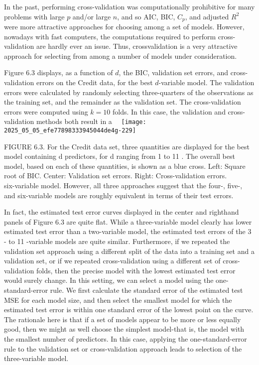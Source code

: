 \documentclass[10pt]{article}
\begin{document}
In the past, performing cross-validation was computationally prohibitive for many problems with large $p$ and/or large $n$, and so AIC, BIC, $C_{p}$, and adjusted $R^{2}$ were more attractive approaches for choosing among a set of models. However, nowadays with fast computers, the computations required to perform cross-validation are hardly ever an issue. Thus, crossvalidation is a very attractive approach for selecting from among a number of models under consideration.

Figure 6.3 displays, as a function of $d$, the BIC, validation set errors, and cross-validation errors on the Credit data, for the best $d$-variable model. The validation errors were calculated by randomly selecting three-quarters of the observations as the training set, and the remainder as the validation set. The cross-validation errors were computed using $k=10$ folds. In this case, the validation and cross-validation methods both result in a\
\
\texttt{[image: 2025\_05\_05\_efe77898333945044de4g-229]}

FIGURE 6.3. For the Credit data set, three quantities are displayed for the best model containing d predictors, for d ranging from 1 to 11 . The overall best model, based on each of these quantities, is shown as a blue cross. Left: Square root of BIC. Center: Validation set errors. Right: Cross-validation errors.\\
six-variable model. However, all three approaches suggest that the four-, five-, and six-variable models are roughly equivalent in terms of their test errors.

In fact, the estimated test error curves displayed in the center and righthand panels of Figure 6.3 are quite flat. While a three-variable model clearly has lower estimated test error than a two-variable model, the estimated test errors of the 3 - to 11 -variable models are quite similar. Furthermore, if we repeated the validation set approach using a different split of the data into a training set and a validation set, or if we repeated cross-validation using a different set of cross-validation folds, then the precise model with the lowest estimated test error would surely change. In this setting, we can select a model using the one-standard-error rule. We first calculate the standard error of the estimated test MSE for each model size, and then select the smallest model for which the estimated test error is within one standard error of the lowest point on the curve. The rationale here is that if a set of models appear to be more or less equally good, then we might as well choose the simplest model-that is, the model with the smallest number of predictors. In this case, applying the one-standard-error rule to the validation set or cross-validation approach leads to selection of the three-variable model.
\end{document}
